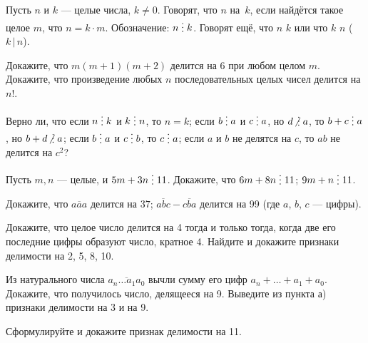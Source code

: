 \documentclass[a4paper,12pt]{article}
\newcommand{\del}{\mathrel{\raisebox{-.3 ex}{${\vdots}$}}}
\begin{document}


Пусть $n$ и $k$ --- целые числа, $k\ne0$.
Говорят, что $n$ 
на~$k$, если найдётся такое целое $m$,
что $n=k\cdot m$. Обозначение: $n\del k$.
Говорят ещ\"е, что $n$  $k$
или что $k$  $n$ ($k\,|\,n$).

Докажите, что $m(m+1)(m+2)$ делится на 6 при любом целом $m$.\\
Докажите, что произведение любых $n$ последовательных
целых чисел делится на $n!$.

 Верно ли, что
если $n\del k$ и $k\del n$, то $n=k$;
если $b\del a$ и $c\del a$, но $d\!\not\,\,\del a$, то $b+c\del a$, но
$b+d\!\not\,\,\del a$;
если $b\del a$ и $c\del b$, то $c\del a$;
если $a$ и $b$ не делятся на $c$, то $ab$ не делится на $c^2$?

Пусть $m,n$ --- целые, и $5m+3n\del11$. Докажите, что
$6m+8n\del11$;
  $9m+n\del11$.

Докажите, что
$\overline{aaa}$ делится на $37$;
$\overline{abc}-\overline{cba}$ делится на 99 (где $a$, $b$, $c$ --- цифры).

 Докажите, что целое число делится на 4 тогда и только тогда,
когда две его последние цифры образуют число, кратное 4.
 Найдите и докажите признаки делимости на 2, 5, 8, 10.

Из натурального числа $\overline{a_n\ldots a_1a_0}$ вычли сумму
его цифр $a_n+\ldots+a_1+a_0$. Докажите, что получилось число,
делящееся на 9.
Выведите из пункта а) признаки делимости на 3 и на 9.

Сформулируйте и докажите признак делимости на 11.



\end{document}
